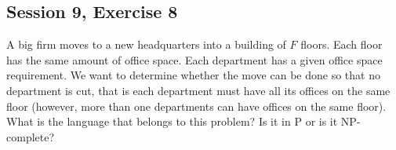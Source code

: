 \subsection {Session 9, Exercise 8}


A big firm moves to a new headquarters into a building of $F$ floors. Each floor has the same amount of office
space. Each department has a given office space requirement. We want to determine whether the move can
be done so that no department is cut, that is each department must have all its offices on the same floor
(however, more than one departments can have offices on the same floor). What is the language that belongs
to this problem? Is it in P or is it NP-complete?



